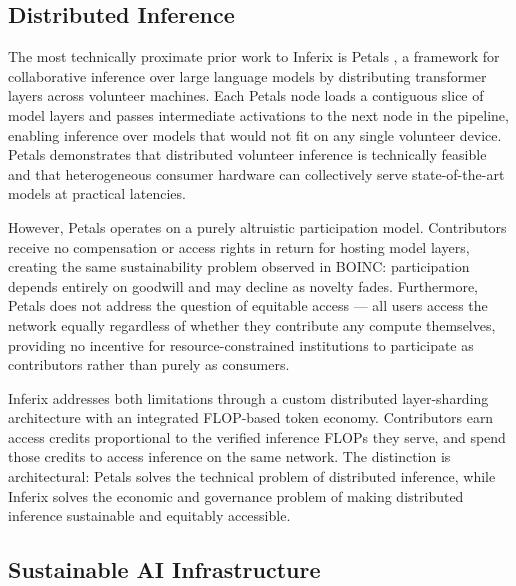 \documentclass[12pt]{article}
\begin{document}
\subsection{Distributed Inference}

The most technically proximate prior work to Inferix is Petals \cite{borzunov2022petals}, a framework for collaborative inference over large language models by distributing transformer layers across volunteer machines. Each Petals node loads a contiguous slice of model layers and passes intermediate activations to the next node in the pipeline, enabling inference over models that would not fit on any single volunteer device. Petals demonstrates that distributed volunteer inference is technically feasible and that heterogeneous consumer hardware can collectively serve state-of-the-art models at practical latencies.

However, Petals operates on a purely altruistic participation model. Contributors receive no compensation or access rights in return for hosting model layers, creating the same sustainability problem observed in BOINC: participation depends entirely on goodwill and may decline as novelty fades. Furthermore, Petals does not address the question of equitable access — all users access the network equally regardless of whether they contribute any compute themselves, providing no incentive for resource-constrained institutions to participate as contributors rather than purely as consumers.

Inferix addresses both limitations through a custom distributed layer-sharding architecture with an integrated FLOP-based token economy. Contributors earn access credits proportional to the verified inference FLOPs they serve, and spend those credits to access inference on the same network. The distinction is architectural: Petals solves the technical problem of distributed inference, while Inferix solves the economic and governance problem of making distributed inference sustainable and equitably accessible.

\subsection{Sustainable AI Infrastructure}
\end{document}
